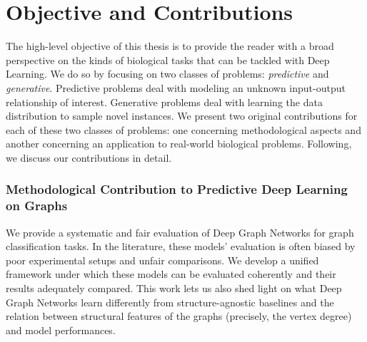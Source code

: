 \section{Objective and Contributions}
The high-level objective of this thesis is to provide the reader with a broad perspective on the kinds of biological tasks that can be tackled with Deep Learning. We do so by focusing on two classes of problems: \emph{predictive} and \emph{generative}. Predictive problems deal with modeling an unknown input-output relationship of interest. Generative problems deal with learning the data distribution to sample novel instances. We present two original contributions for each of these two classes of problems: one concerning methodological aspects and another concerning an application to real-world biological problems. Following, we discuss our contributions in detail.

\subsubsection*{Methodological Contribution to Predictive Deep Learning on Graphs}
We provide a systematic and fair evaluation of Deep Graph Networks for graph classification tasks. In the literature, these models' evaluation is often biased by poor experimental setups and unfair comparisons. We develop a unified framework under which these models can be evaluated coherently and their results adequately compared. This work lets us also shed light on what Deep Graph Networks learn differently from structure-agnostic baselines and the relation between structural features of the graphs (precisely, the vertex degree) and model performances.

